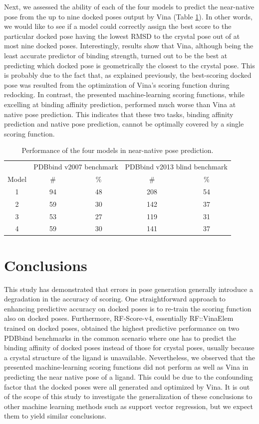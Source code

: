 Next, we assessed the ability of each of the four models to predict the near-native pose from the up to nine docked poses output by Vina (Table \ref{rfscore4:near-native}). In other words, we would like to see if a model could correctly assign the best score to the particular docked pose having the lowest RMSD to the crystal pose out of at most nine docked poses. Interestingly, results show that Vina, although being the least accurate predictor of binding strength, turned out to be the best at predicting which docked pose is geometrically the closest to the crystal pose. This is probably due to the fact that, as explained previously, the best-scoring docked pose was resulted from the optimization of Vina's scoring function during redocking. In contrast, the presented machine-learning scoring functions, while excelling at binding affinity prediction, performed much worse than Vina at native pose prediction. This indicates that these two tasks, binding affinity prediction and native pose prediction, cannot be optimally covered by a single scoring function.

\begin{table}
\caption{Performance of the four models in near-native pose prediction.}
\label{rfscore4:near-native}
\begin{tabular}{ccccc}
\hline
& \multicolumn{2}{c}{PDBbind v2007 benchmark} & \multicolumn{2}{c}{PDBbind v2013 blind benchmark}\\
Model & \# & \% & \# & \%\\
\hline
1 & 94 & 48 & 208 & 54\\
2 & 59 & 30 & 142 & 37\\
3 & 53 & 27 & 119 & 31\\
4 & 59 & 30 & 141 & 37\\
\hline
\end{tabular}
\end{table}

\section{Conclusions}

This study has demonstrated that errors in pose generation generally introduce a degradation in the accuracy of scoring. One straightforward approach to enhancing predictive accuracy on docked poses is to re-train the scoring function also on docked poses. Furthermore, RF-Score-v4, essentially RF::VinaElem trained on docked poses, obtained the highest predictive performance on two PDBbind benchmarks in the common scenario where one has to predict the binding affinity of docked poses instead of those for crystal poses, usually because a crystal structure of the ligand is unavailable. Nevertheless, we observed that the presented machine-learning scoring functions did not perform as well as Vina in predicting the near native pose of a ligand. This could be due to the confounding factor that the docked poses were all generated and optimized by Vina. It is out of the scope of this study to investigate the generalization of these conclusions to other machine learning methods such as support vector regression, but we expect them to yield similar conclusions.

